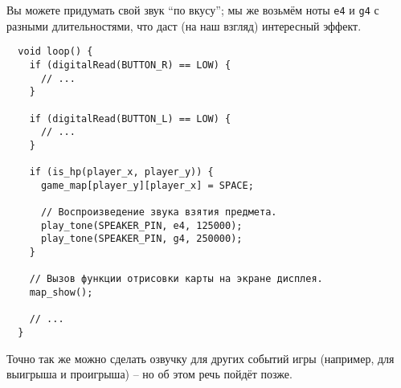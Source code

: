 \documentclass[../sparc.tex]{subfiles}
\begin{document}
Вы можете придумать свой звук ``по вкусу''; мы же возьмём ноты \texttt{e4} и
\texttt{g4} с разными длительностями, что даст (на наш взгляд) интересный
эффект.

\begin{verbatim}
  void loop() {
    if (digitalRead(BUTTON_R) == LOW) {
      // ...
    }

    if (digitalRead(BUTTON_L) == LOW) {
      // ...
    }

    if (is_hp(player_x, player_y)) {
      game_map[player_y][player_x] = SPACE;

      // Воспроизведение звука взятия предмета.
      play_tone(SPEAKER_PIN, e4, 125000);
      play_tone(SPEAKER_PIN, g4, 250000);
    }

    // Вызов функции отрисовки карты на экране дисплея.
    map_show();

    // ...
  }
\end{verbatim}

Точно так же можно сделать озвучку для других событий игры (например, для
выигрыша и проигрыша) -- но об этом речь пойдёт позже.
\end{document}
